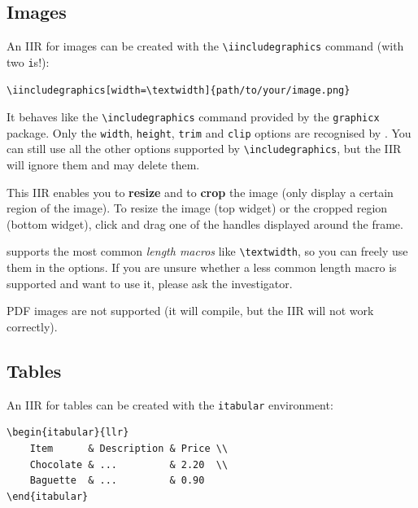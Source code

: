 \documentclass[11pt, a4paper]{article}
\begin{document}
\newpage
\subsection{Images}

An IIR for images can be created with the \verb|\iincludegraphics| command (with two \texttt{i}s!):

\begin{lstlisting}[style=custom-latex]
\iincludegraphics[width=\textwidth]{path/to/your/image.png}
\end{lstlisting}

It behaves like the \verb|\includegraphics| command provided by the \texttt{graphicx} package.
Only the \texttt{width}, \texttt{height}, \texttt{trim} and \texttt{clip} options are recognised by \iLaTeX{}.
You can still use all the other options supported by \verb|\includegraphics|, but the IIR will ignore them and may delete them.

This IIR enables you to \textbf{resize} and to \textbf{crop} the image (\ie only display a certain region of the image). To resize the image (top widget) or the cropped region (bottom widget), click and drag one of the handles displayed around the frame.

\begin{info}
    \iLaTeX{} supports the most common \emph{length macros} like \verb|\textwidth|, so you can freely use them in the options.
    If you are unsure whether a less common length macro is supported and want to use it, please ask the investigator.
\end{info}

\begin{warning}
    PDF images are not supported (it will compile, but the IIR will not work correctly).
\end{warning}

\begin{example}
    \centering
\end{example}




\newpage
\subsection{Tables}

An IIR for tables can be created with the \texttt{itabular} environment:

\begin{lstlisting}[style=custom-latex]
\begin{itabular}{llr}
    Item      & Description & Price \\
    Chocolate & ...         & 2.20  \\
    Baguette  & ...         & 0.90
\end{itabular}
\end{lstlisting}
\end{document}
